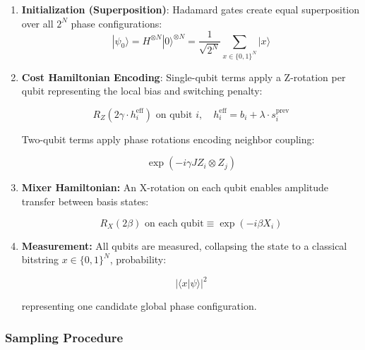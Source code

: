 \documentclass[12pt]{article}
\begin{document}
\begin{enumerate}
    \item \textbf{Initialization (Superposition)}: Hadamard gates create equal superposition over all \(2^{N}\) phase configurations:
\begin{equation}
    \label{eq:initialization}
    |\psi_0\rangle = H^{\otimes N}|0\rangle^{\otimes N} = \frac{1}{\sqrt{2^N}}\sum_{x\in\{0,1\}^N}|x\rangle
\end{equation}



    \item \textbf{Cost Hamiltonian Encoding}: Single-qubit terms apply a Z-rotation per qubit representing the local bias and switching penalty:

\begin{equation}
\label{eq:cost_hamiltonian}
    R_Z\!\left(2\gamma \cdot h_i^{\text{eff}}\right) \text{ on qubit } i, \quad h_i^{\text{eff}} = b_i + \lambda\cdot s_i^{\text{prev}}
\end{equation}



Two-qubit terms apply phase rotations encoding neighbor coupling:

\begin{equation}
\label{eq:neighbor_coupling}
    \exp\!\left(-i\gamma J Z_i\otimes Z_j\right)
\end{equation}



    \item \textbf{Mixer Hamiltonian:} An X-rotation on each qubit enables amplitude transfer between basis states:

\begin{equation}
\label{eq:mixer_hamiltonian}
    R_X(2\beta) \text{ on each qubit} \equiv \exp(-i\beta X_i)
\end{equation}



    \item \textbf{Measurement:} All qubits are measured, collapsing the state to a classical bitstring $x \in \{0,1\}^N$, probability:

\begin{equation}
\label{eq:qbit_measurement}
    |\langle x|\psi\rangle|^2
\end{equation}


representing one candidate global phase configuration.
\end{enumerate}


\subsubsection{Sampling Procedure}
\end{document}
